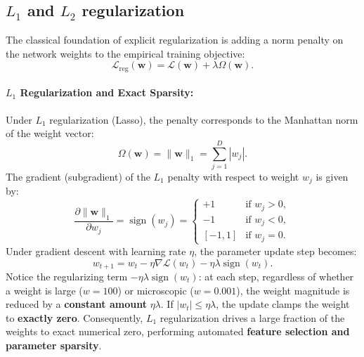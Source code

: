 \subsection{$L_1$ and $L_2$ regularization}
\label{sec:l1_l2_regularization}
\label{sec:weight_decay_deep}

The classical foundation of explicit regularization is adding a norm penalty on the network weights to the empirical training objective:
\begin{equation}
\mathcal{L}_{\text{reg}}(\mathbf{w}) = \mathcal{L}(\mathbf{w}) + \lambda \Omega(\mathbf{w}).
\end{equation}

\paragraph{$L_1$ Regularization and Exact Sparsity:}
Under $L_1$ regularization (Lasso), the penalty corresponds to the Manhattan norm of the weight vector:
\begin{equation}
\Omega(\mathbf{w}) = \|\mathbf{w}\|_1 = \sum_{j=1}^D |w_j|.
\label{eq:l1_norm_penalty}
\end{equation}
The gradient (subgradient) of the $L_1$ penalty with respect to weight $w_j$ is given by:
\begin{equation}
\frac{\partial \|\mathbf{w}\|_1}{\partial w_j} = \operatorname{sign}(w_j) = \begin{cases} +1 & \text{if } w_j > 0, \\ -1 & \text{if } w_j < 0, \\ [-1, 1] & \text{if } w_j = 0. \end{cases}
\end{equation}
Under gradient descent with learning rate $\eta$, the parameter update step becomes:
\begin{equation}
w_{t+1} = w_t - \eta \nabla \mathcal{L}(w_t) - \eta \lambda \operatorname{sign}(w_t).
\label{eq:l1_gradient_update}
\end{equation}
Notice the regularizing term $-\eta \lambda \operatorname{sign}(w_t)$: at each step, regardless of whether a weight is large ($w = 100$) or microscopic ($w = 0.001$), the weight magnitude is reduced by a \textbf{constant amount} $\eta \lambda$. If $|w_t| \le \eta \lambda$, the update clamps the weight to \textbf{exactly zero}. Consequently, $L_1$ regularization drives a large fraction of the weights to exact numerical zero, performing automated \textbf{feature selection and parameter sparsity}.

